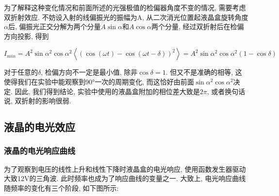 \documentclass[12pt,a4paper]{article}
\newcommand{\be}[1]{
    \begin{equation}
        #1
    \end{equation}
}
\begin{document}
为了解释这种变化情况和前面所述的光强极值的检偏器角度不变的情况, 需要考虑双折射效应. 不妨设入射的线偏振光的振幅为A, 从二次消光位置起液晶盒旋转角度$\alpha$后, 
偏振光正交分解为两个分量$A\sin{\alpha}$和$A\cos{\alpha}$两个分量, 经过双折射后在检偏方向投影, 得到
\be{I_{min}=A^2\sin{\alpha}^2\cos{\alpha}^2\left \langle (\cos{(\omega t) }-\cos{(\omega t -\delta)})^2 \right \rangle  =A^2\sin{\alpha}^2\cos{\alpha}^2(1-\cos{\delta})}

对于任意的$\delta$, 检偏方向不一定是最小值, 除非$\cos{\delta}=1$. 但又不是准确的相等, 这使得我们在实验中能观察到90°一次的周期变化, 而这恰好由前面$\sin{\alpha}^2\cos{\alpha}^2$决定. 因此, 我们得到结论, 实验中使用的液晶盒附加的相位差大致是$2\pi$, 或者换句话说, 双折射的影响很弱. 
\subsection{液晶的电光效应}
\subsubsection{液晶的电光响应曲线}
为了观察到电压的线性上升和线性下降时液晶盒的电光响应, 使用函数发生器驱动大致12V的三角波. 此时频率也成为了响应曲线的变量之一. 大致上, 电光响应曲线随频率的变化有三个阶段, 如下图所示: 
\end{document}
